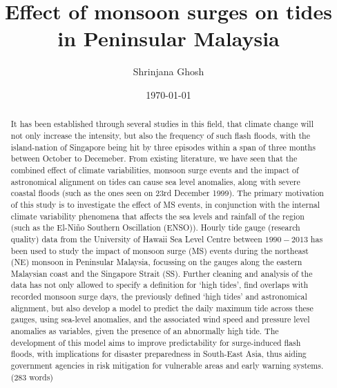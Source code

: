 \documentclass[12pt]{article}
\begin{document}
\title{\vspace{-2.0cm}Effect of monsoon surges on tides in Peninsular Malaysia}
\author{Shrinjana Ghosh}
\date{\today}
\vfill





\maketitle

\begin{abstract}
    It has been established through several studies in this field, 
    that climate change will not only increase the intensity, but also the frequency of such flash floods, with the island-nation of Singapore 
    being hit by three episodes within a span of three months between October to Decemeber. From existing literature, we have seen that the combined effect of climate variabilities, monsoon surge events
    and the impact of astronomical alignment on tides can cause sea level anomalies, along with severe coastal floods (such as the ones 
    seen on 23rd December 1999). The primary motivation of this study is to investigate the effect of MS events, in conjunction with the internal 
    climate variability phenomena that affects the sea levels and rainfall of the region (such as the El-Niño Southern
    Oscillation (ENSO)). Hourly tide gauge (research quality) data from the University of Hawaii Sea Level Centre
    between $1990-2013$ has been used to study the impact of monsoon surge (MS) events during the northeast (NE)
    monsoon in Peninsular Malaysia, focussing on the gauges along the eastern Malaysian coast and the Singapore Strait (SS). Further cleaning
    and analysis of the data has not only allowed to specify a definition for `high tides', find overlaps with recorded monsoon surge days, the previously defined
    `high tides' and astronomical alignment, but also develop a model to predict the daily maximum tide across these gauges, using sea-level anomalies, and the 
    associated wind speed and pressure level anomalies as variables, given the presence of an abnormally high tide. The development of this model
    aims to improve predictability for surge-induced flash floods, with implications for disaster preparedness in South-East Asia, thus aiding
    government agencies in risk mitigation for vulnerable areas and early warning systems. (283 words)
\end{abstract}
\end{document}
